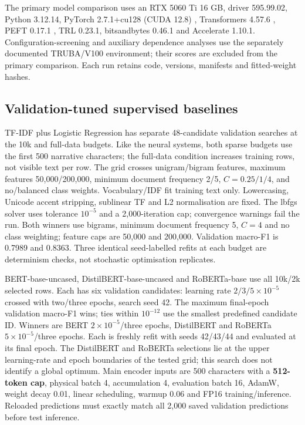 \documentclass{elektr}
\begin{document}
The primary model comparison uses an RTX 5060 Ti 16 GB, driver 595.99.02, Python 3.12.14, PyTorch 2.7.1+cu128 (CUDA 12.8) \cite{paszke2019pytorch}, Transformers 4.57.6 \cite{wolf2020transformers}, PEFT 0.17.1 \cite{mangrulkar2022peft}, TRL 0.23.1, bitsandbytes 0.46.1 and Accelerate 1.10.1. Configuration-screening and auxiliary dependence analyses use the separately documented TRUBA/V100 environment; their scores are excluded from the primary comparison. Each run retains code, versions, manifests and fitted-weight hashes.

\subsection{Validation-tuned supervised baselines}
\label{sec:baselines}
TF-IDF plus Logistic Regression has separate 48-candidate validation searches at the 10k and full-data budgets. Like the neural systems, both sparse budgets use the first 500 narrative characters; the full-data condition increases training rows, not visible text per row. The grid crosses unigram/bigram features, maximum features 50,000/200,000, minimum document frequency 2/5, $C=0.25/1/4$, and no/balanced class weights. Vocabulary/IDF fit training text only. Lowercasing, Unicode accent stripping, sublinear TF and L2 normalisation are fixed. The lbfgs solver uses tolerance $10^{-5}$ and a 2,000-iteration cap; convergence warnings fail the run. Both winners use bigrams, minimum document frequency 5, $C=4$ and no class weighting; feature caps are 50,000 and 200,000. Validation macro-F1 is 0.7989 and 0.8363. Three identical seed-labelled refits at each budget are determinism checks, not stochastic optimisation replicates.

BERT-base-uncased, DistilBERT-base-uncased and RoBERTa-base use all 10k/2k selected rows. Each has six validation candidates: learning rate $2/3/5\times10^{-5}$ crossed with two/three epochs, search seed 42. The maximum final-epoch validation macro-F1 wins; ties within $10^{-12}$ use the smallest predefined candidate ID. Winners are BERT $2\times10^{-5}$/three epochs, DistilBERT and RoBERTa $5\times10^{-5}$/three epochs. Each is freshly refit with seeds 42/43/44 and evaluated at its final epoch. The DistilBERT and RoBERTa selections lie at the upper learning-rate and epoch boundaries of the tested grid; this search does not identify a global optimum. Main encoder inputs are 500 characters with a \textbf{512-token cap}, physical batch 4, accumulation 4, evaluation batch 16, AdamW, weight decay 0.01, linear scheduling, warmup 0.06 and FP16 training/inference. Reloaded predictions must exactly match all 2,000 saved validation predictions before test inference.
\end{document}
